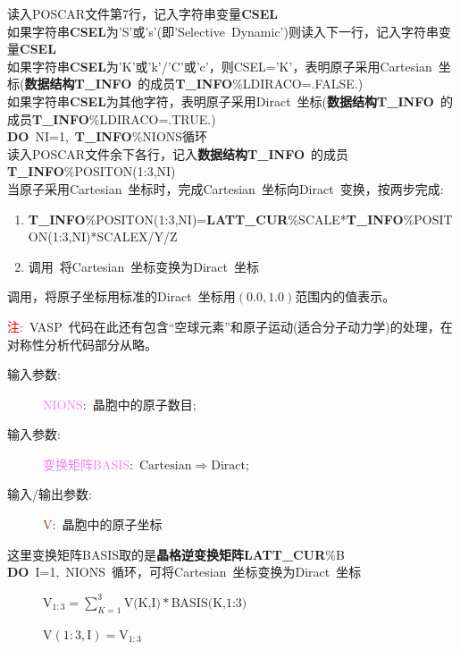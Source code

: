 \documentclass{article}      %
\begin{document}
读入\textrm{POSCAR}文件第7行，记入字符串变量\textbf{CSEL}\\
如果字符串\textbf{CSEL}为\textrm{'S'}或\textrm{'s'}(即\textrm{'Selective~Dynamic'})则读入下一行，记入字符串变量\textbf{CSEL}\\
如果字符串\textbf{CSEL}为\textrm{'K'}或\textrm{'k'}/\textrm{'C'}或\textrm{'c'}，则\textrm{CSEL='K'}，表明原子采用\textrm{Cartesian~}坐标(\textbf{数据结构T\_INFO}~的成员\textbf{T\_INFO}\%\textrm{LDIRACO}=\textrm{.FALSE.})\\
如果字符串\textbf{CSEL}为其他字符，表明原子采用\textrm{Diract~}坐标(\textbf{数据结构T\_INFO}~的成员\textbf{T\_INFO}\%\textrm{LDIRACO}=\textrm{.TRUE.})\\
\textbf{DO}~\textrm{NI}=1,~\textbf{T\_INFO}\%\textrm{NIONS}循环\\
读入\textrm{POSCAR}文件余下各行，记入\textbf{数据结构T\_INFO}~的成员\textbf{T\_INFO}\%\textrm{POSITON(1:3,NI)}\\

当原子采用\textrm{Cartesian~}坐标时，完成\textrm{Cartesian~}坐标向\textrm{Diract~}变换，按两步完成:~
\begin{enumerate}
	\item \textbf{T\_INFO}\%\textrm{POSITON(1:3,NI)}=\textbf{LATT\_CUR}\%\textrm{SCALE}*\textbf{T\_INFO}\%\textrm{POSITON(1:3,NI)}*\textrm{SCALEX/Y/Z}
	\item 调用~将\textrm{Cartesian~}坐标变换为\textrm{Diract~}坐标
\end{enumerate}
调用，将原子坐标用标准的\textrm{Diract~}坐标用$(0.0,1.0)$范围内的值表示。

\textcolor{red}{注:~}\textrm{VASP~}代码在此还有包含“空球元素”和原子运动(适合分子动力学)的处理，在对称性分析代码部分从略。

\vskip 30pt
\begin{description}
	\item[输入参数:~]\textcolor{violet}{\textrm{NIONS}}:~晶胞中的原子数目;
	\item[输入参数:~]\textcolor{violet}{变换矩阵\textrm{BASIS}}:~$\mathrm{Cartesian}\Longrightarrow\mathrm{Diract}$;
	\item[输入/输出参数:~]\textcolor{brown}{\textrm{V}}:~晶胞中的原子坐标
\end{description}
这里变换矩阵\textrm{BASIS}取的是\textbf{晶格逆变换矩阵}\textbf{LATT\_CUR}\%\textrm{B}\\
\textbf{DO}~\textrm{I}=1,~\textrm{NIONS}~循环，可将\textrm{Cartesian~}坐标变换为\textrm{Diract~}坐标
\begin{description}
	\item[] $\mathrm{V_{1:3}}=\sum\limits_{K=1}^3\textrm{V(K,I)}*\textrm{BASIS(K,1:3)}$
	\item[] $\mathrm{V(1:3,I)}=\mathrm{V_{1:3}}$
\end{description}
\end{document}
